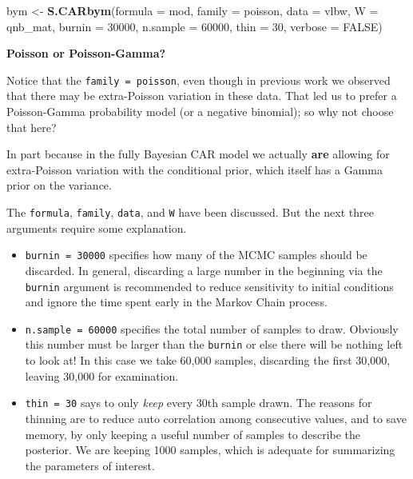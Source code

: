 \documentclass[
]{book}
\newenvironment{Shaded}{\begin{snugshade}}{\end{snugshade}}
\newcommand{\AttributeTok}[1]{\textcolor[rgb]{0.13,0.29,0.53}{#1}}
\newcommand{\ConstantTok}[1]{\textcolor[rgb]{0.56,0.35,0.01}{#1}}
\newcommand{\DecValTok}[1]{\textcolor[rgb]{0.00,0.00,0.81}{#1}}
\newcommand{\FunctionTok}[1]{\textcolor[rgb]{0.13,0.29,0.53}{\textbf{#1}}}
\newcommand{\NormalTok}[1]{#1}
\newcommand{\OtherTok}[1]{\textcolor[rgb]{0.56,0.35,0.01}{#1}}
\newcommand{\StringTok}[1]{\textcolor[rgb]{0.31,0.60,0.02}{#1}}
\providecommand{\tightlist}{%
  \setlength{\itemsep}{0pt}\setlength{\parskip}{0pt}}
\newenvironment{rmdnote}[1]
  {
  \begin{itemize}
  \renewcommand{\labelitemi}{
    \raisebox{-.7\height}[0pt][0pt]{
      {\setkeys{Gin}{width=3em,keepaspectratio}\texttt{[image: images/\#1]}}
    }
  }
  \setlength{\fboxsep}{1em}
  \begin{note}
  \item
  }
  {
  \end{note}
  \end{itemize}
  }
\begin{document}
\begin{Shaded}
\begin{Highlighting}[]
\NormalTok{bym }\OtherTok{\textless{}{-}} \FunctionTok{S.CARbym}\NormalTok{(}\AttributeTok{formula =}\NormalTok{ mod, }
                        \AttributeTok{family =} \StringTok{\textquotesingle{}poisson\textquotesingle{}}\NormalTok{, }
                        \AttributeTok{data =}\NormalTok{ vlbw, }
                        \AttributeTok{W =}\NormalTok{ qnb\_mat,}
                        \AttributeTok{burnin =} \DecValTok{30000}\NormalTok{, }
                        \AttributeTok{n.sample =} \DecValTok{60000}\NormalTok{, }
                        \AttributeTok{thin =} \DecValTok{30}\NormalTok{,}
                        \AttributeTok{verbose =} \ConstantTok{FALSE}\NormalTok{)}
\end{Highlighting}
\end{Shaded}

\begin{rmdnote}{note}
\textbf{Poisson or Poisson-Gamma?}

Notice that the \texttt{family\ =\ \textquotesingle{}poisson\textquotesingle{}}, even though in previous work we observed that there may be extra-Poisson variation in these data. That led us to prefer a Poisson-Gamma probability model (or a negative binomial); so why not choose that here?

In part because in the fully Bayesian CAR model we actually \textbf{are} allowing for extra-Poisson variation with the conditional prior, which itself has a Gamma prior on the variance.

\end{rmdnote}

The \texttt{formula}, \texttt{family}, \texttt{data}, and \texttt{W} have been discussed. But the next three arguments require some explanation.

\begin{itemize}
\tightlist
\item
  \texttt{burnin\ =\ 30000} specifies how many of the MCMC samples should be discarded. In general, discarding a large number in the beginning via the \texttt{burnin} argument is recommended to reduce sensitivity to initial conditions and ignore the time spent early in the Markov Chain process.
\item
  \texttt{n.sample\ =\ 60000} specifies the total number of samples to draw. Obviously this number must be larger than the \texttt{burnin} or else there will be nothing left to look at! In this case we take 60,000 samples, discarding the first 30,000, leaving 30,000 for examination.
\item
  \texttt{thin\ =\ 30} says to only \emph{keep} every 30th sample drawn. The reasons for thinning are to reduce auto correlation among consecutive values, and to save memory, by only keeping a useful number of samples to describe the posterior. We are keeping 1000 samples, which is adequate for summarizing the parameters of interest.
\end{itemize}
\end{document}
